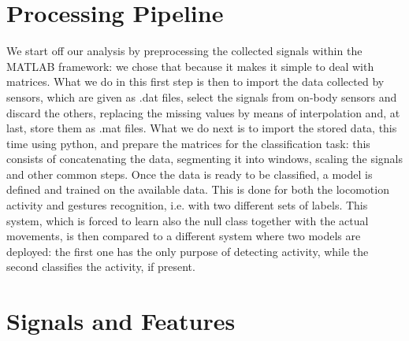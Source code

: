 
\section{Processing Pipeline}
\label{sec:processing_architecture}

We start off our analysis by preprocessing the collected signals within the MATLAB framework: we chose that because it makes it simple to deal with matrices. What we do in this first step is then to import the data collected by sensors, which are given as .dat files, select the signals from on-body sensors and discard the others, replacing the missing values by means of interpolation and, at last, store them as .mat files.
What we do next is to import the stored data, this time using python, and prepare the matrices for the classification task: this consists of concatenating the data, segmenting it into windows, scaling the signals and other common steps.
Once the data is ready to be classified, a model is defined and trained on the available data. This is done for both the locomotion activity and gestures recognition, i.e. with two different sets of labels. This system, which is forced to learn also the null class together with the actual movements, is then compared to a different system where two models are deployed: the first one has the only purpose of detecting activity, while the second classifies the activity, if present.

\section{Signals and Features}
\label{sec:model}

